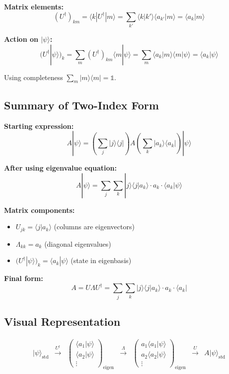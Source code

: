 \documentclass[11pt,a4paper]{article}
\begin{document}
\textbf{Matrix elements:}
$$(U^\dagger)_{km} = \langle k|U^\dagger|m\rangle = \sum_{k'} \langle k|k'\rangle\langle a_{k'}|m\rangle = \langle a_k|m\rangle$$

\textbf{Action on $|\psi\rangle$:}
$$(U^\dagger|\psi\rangle)_k = \sum_m (U^\dagger)_{km}\langle m|\psi\rangle = \sum_m \langle a_k|m\rangle\langle m|\psi\rangle = \langle a_k|\psi\rangle$$

Using completeness $\sum_m |m\rangle\langle m| = \mathbb{1}$.

\subsection*{Summary of Two-Index Form}

\textbf{Starting expression:}
$$A|\psi\rangle = \left(\sum_j |j\rangle\langle j|\right) A \left(\sum_k |a_k\rangle\langle a_k|\right) |\psi\rangle$$

\textbf{After using eigenvalue equation:}
$$\boxed{A|\psi\rangle = \sum_j \sum_k |j\rangle \langle j|a_k\rangle \cdot a_k \cdot \langle a_k|\psi\rangle}$$

\textbf{Matrix components:}
\begin{itemize}
\item $U_{jk} = \langle j|a_k\rangle$ (columns are eigenvectors)
\item $\Lambda_{kk} = a_k$ (diagonal eigenvalues)
\item $(U^\dagger|\psi\rangle)_k = \langle a_k|\psi\rangle$ (state in eigenbasis)
\end{itemize}

\textbf{Final form:}
$$\boxed{A = U\Lambda U^\dagger = \sum_j \sum_k |j\rangle\langle j|a_k\rangle \cdot a_k \cdot \langle a_k|}$$

\subsection*{Visual Representation}

$$\begin{array}{ccccc}
|\psi\rangle_{\text{std}} & \xrightarrow{U^\dagger} & \begin{pmatrix} \langle a_1|\psi\rangle \\ \langle a_2|\psi\rangle \\ \vdots \end{pmatrix}_{\text{eigen}} & \xrightarrow{\Lambda} & \begin{pmatrix} a_1\langle a_1|\psi\rangle \\ a_2\langle a_2|\psi\rangle \\ \vdots \end{pmatrix}_{\text{eigen}} & \xrightarrow{U} & A|\psi\rangle_{\text{std}}
\end{array}$$
\end{document}
